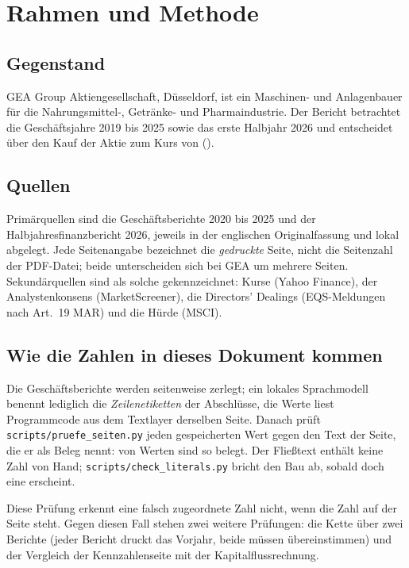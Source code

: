 \section*{Rahmen und Methode}
\label{sec:methode}

\subsection*{Gegenstand}

GEA Group Aktiengesellschaft, D\"usseldorf, ist ein Maschinen- und Anlagenbauer f\"ur die
Nahrungsmittel-, Getr\"anke- und Pharmaindustrie. Der Bericht betrachtet die
Gesch\"aftsjahre 2019 bis 2025 sowie das erste Halbjahr 2026 und entscheidet \"uber den
Kauf der Aktie zum Kurs von  (\KursDatum).

\subsection*{Quellen}

Prim\"arquellen sind die Gesch\"aftsberichte 2020 bis 2025 und der Halbjahresfinanzbericht
2026, jeweils in der englischen Originalfassung und lokal abgelegt. Jede Seitenangabe
bezeichnet die \emph{gedruckte} Seite, nicht die Seitenzahl der PDF-Datei; beide
unterscheiden sich bei GEA um mehrere Seiten. Sekund\"arquellen sind als solche
gekennzeichnet: Kurse (Yahoo Finance), der Analystenkonsens (MarketScreener), die
Directors' Dealings (EQS-Meldungen nach Art.~19 MAR) und die H\"urde (MSCI).

\subsection*{Wie die Zahlen in dieses Dokument kommen}

Die Gesch\"aftsberichte werden seitenweise zerlegt; ein lokales Sprachmodell benennt
lediglich die \emph{Zeilenetiketten} der Abschl\"usse, die Werte liest Programmcode aus
dem Textlayer derselben Seite. Danach pr\"uft \texttt{scripts/pruefe\_seiten.py} jeden
gespeicherten Wert gegen den Text der Seite, die er als Beleg nennt:
\GeprueftAnzahl{} von \GeprueftAnzahl{} Werten sind so belegt. Der Flie{\ss}text enth\"alt
keine Zahl von Hand; \texttt{scripts/check\_literals.py} bricht den Bau ab, sobald doch
eine erscheint.

Diese Pr\"ufung erkennt eine falsch zugeordnete Zahl nicht, wenn die Zahl auf der Seite
steht. Gegen diesen Fall stehen zwei weitere Pr\"ufungen: die Kette \"uber zwei Berichte
(jeder Bericht druckt das Vorjahr, beide m\"ussen \"ubereinstimmen) und der Vergleich der
Kennzahlenseite mit der Kapitalflussrechnung.

